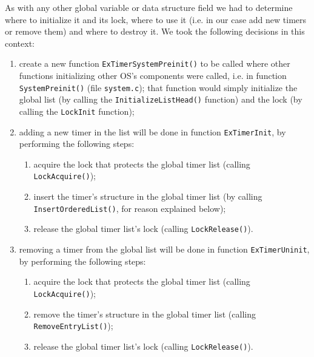 As with any other global variable or data structure field we had to determine where to initialize it and its lock, where to use it (i.e. in our case add new timers or remove them) and where to destroy it. We took the following decisions in this context:
\begin{enumerate}
    \item create a new function \lstinline|ExTimerSystemPreinit()| to be called where other functions initializing other OS's components were called, i.e. in function \lstinline|SystemPreinit()| (file \lstinline|system.c|); that function would simply initialize the global list (by calling the \lstinline|InitializeListHead()| function) and the lock (by calling the \lstinline|LockInit| function);
    
    \item adding a new timer in the list will be done in function \lstinline|ExTimerInit|, by performing the following steps:
        \begin{enumerate}
            \item acquire the lock that protects the global timer list (calling \lstinline|LockAcquire()|);
            
            \item insert the timer's structure in the global timer list (by calling \lstinline|InsertOrderedList()|, for reason explained below);
            
            \item release the global timer list's lock (calling \lstinline|LockRelease()|).
        \end{enumerate}

    \item removing a timer from the global list will be done in function \lstinline|ExTimerUninit|, by performing the following steps:
        \begin{enumerate}
            \item acquire the lock that protects the global timer list (calling \lstinline|LockAcquire()|);
            
            \item remove the timer's structure in the global timer list (calling \lstinline|RemoveEntryList()|);
            
            \item release the global timer list's lock (calling \lstinline|LockRelease()|).
        \end{enumerate}
        

\end{enumerate}

